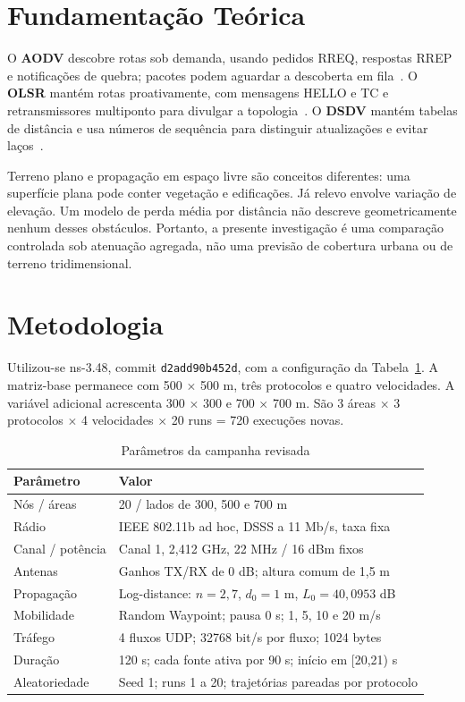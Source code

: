 \documentclass[12pt]{article}
\begin{document}
\section{Fundamentação Teórica}
O \textbf{AODV} descobre rotas sob demanda, usando pedidos RREQ, respostas
RREP e notificações de quebra; pacotes podem aguardar a descoberta em
fila~\cite{rfc3561}. O \textbf{OLSR} mantém rotas proativamente, com mensagens
HELLO e TC e retransmissores multiponto para divulgar a
topologia~\cite{rfc3626}. O \textbf{DSDV} mantém tabelas de distância e usa
números de sequência para distinguir atualizações e evitar
laços~\cite{perkins1994}.

Terreno plano e propagação em espaço livre são conceitos diferentes: uma
superfície plana pode conter vegetação e edificações. Já relevo envolve
variação de elevação. Um modelo de perda média por distância não descreve
geometricamente nenhum desses obstáculos. Portanto, a presente investigação
é uma comparação controlada sob atenuação agregada, não uma previsão de
cobertura urbana ou de terreno tridimensional.

\section{Metodologia}
Utilizou-se ns-3.48, commit \texttt{d2add90b452d}, com a configuração da
Tabela~\ref{tab:cenario}. A matriz-base permanece com 500 $\times$ 500 m,
três protocolos e quatro velocidades. A variável adicional acrescenta
300 $\times$ 300 e 700 $\times$ 700 m. São 3 áreas $\times$ 3 protocolos
$\times$ 4 velocidades $\times$ 20 runs = 720 execuções novas.

\begin{table}[ht]
\centering
\caption{Parâmetros da campanha revisada}
\label{tab:cenario}
\small
\begin{tabular}{ll}
\toprule
Parâmetro & Valor \\
\midrule
Nós / áreas & 20 / lados de 300, 500 e 700 m \\
Rádio & IEEE 802.11b ad hoc, DSSS a 11 Mb/s, taxa fixa \\
Canal / potência & Canal 1, 2,412 GHz, 22 MHz / 16 dBm fixos \\
Antenas & Ganhos TX/RX de 0 dB; altura comum de 1,5 m \\
Propagação & Log-distance: $n=2{,}7$, $d_0=1$ m, $L_0=40{,}0953$ dB \\
Mobilidade & Random Waypoint; pausa 0 s; 1, 5, 10 e 20 m/s \\
Tráfego & 4 fluxos UDP; 32768 bit/s por fluxo; 1024 bytes \\
Duração & 120 s; cada fonte ativa por 90 s; início em [20,21) s \\
Aleatoriedade & Seed 1; runs 1 a 20; trajetórias pareadas por protocolo \\
\bottomrule
\end{tabular}
\end{table}
\end{document}
